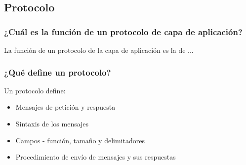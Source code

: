 \documentclass[titlepage,a4paper]{article}
\begin{document}
\subsection{Protocolo\label{sec:protocolo}}


\subsubsection{ ¿Cuál es la función de un protocolo de capa de aplicación?}

La función de un protocolo de la capa de aplicación es la de ...

\subsubsection{¿Qué define un protocolo?} 


Un protocolo define:

\begin{itemize}
    \item Mensajes de petición y respuesta
    \item Sintaxis de los mensajes
    \item Campos - función, tamaño y delimitadores
    \item Procedimiento de envío de mensajes y sus respuestas
\end{itemize}
\end{document}
